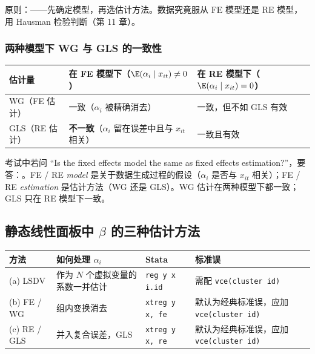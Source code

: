 原则：——先确定模型，再选估计方法。数据究竟服从 FE 模型还是 RE 模型，用 Hausman 检验判断（第 11 章）。

\subsubsection{两种模型下 WG 与 GLS 的一致性}

\begin{center}\begin{minipage}{\linewidth}\centering
{}
\begin{tabularx}{\linewidth}{lLL}
\toprule
估计量 & 在 FE 模型下（$\E(\alpha_i\mid x_{it})\neq0$） & 在 RE 模型下（$\E(\alpha_i\mid x_{it})=0$）\\
\midrule
WG（FE 估计） & 一致（$\alpha_i$ 被精确消去） & 一致，但不如 GLS 有效\\
GLS（RE 估计） & \textbf{不一致}（$\alpha_i$ 留在误差中且与 $x_{it}$ 相关） & 一致且有效\\
\bottomrule
\end{tabularx}
\end{minipage}\end{center}

\begin{keypt}[“FE 模型”是否等于“FE 估计”]
考试中若问 “Is the fixed effects model the same as fixed effects estimation?”，要答：。FE / RE \emph{model} 是关于数据生成过程的假设（$\alpha_i$ 是否与 $x_{it}$ 相关）；FE / RE \emph{estimation} 是估计方法（WG 还是 GLS）。WG 估计在两种模型下都一致；GLS 只在 RE 模型下一致。
\end{keypt}

\subsection{静态线性面板中 \texorpdfstring{$\beta$}{beta} 的三种估计方法}

\begin{center}\begin{minipage}{\linewidth}\centering
{}
\small
\begin{tabularx}{\linewidth}{lLl>{\raggedright\arraybackslash}p{4.6cm}}
\toprule
方法 & 如何处理 $\alpha_i$ & Stata & 标准误\\
\midrule
(a) LSDV & 作为 $N$ 个虚拟变量的系数一并估计 & \texttt{reg y x i.id} & 需配 \mbox{\texttt{vce(cluster id)}}\\
(b) FE / WG & 组内变换消去 & \texttt{xtreg y x, fe} & 默认为经典标准误，应加 \mbox{\texttt{vce(cluster id)}}\\
(c) RE / GLS & 并入复合误差，GLS & \texttt{xtreg y x, re} & 默认为经典标准误，应加 \mbox{\texttt{vce(cluster id)}}\\
\bottomrule
\end{tabularx}
\end{minipage}\end{center}

